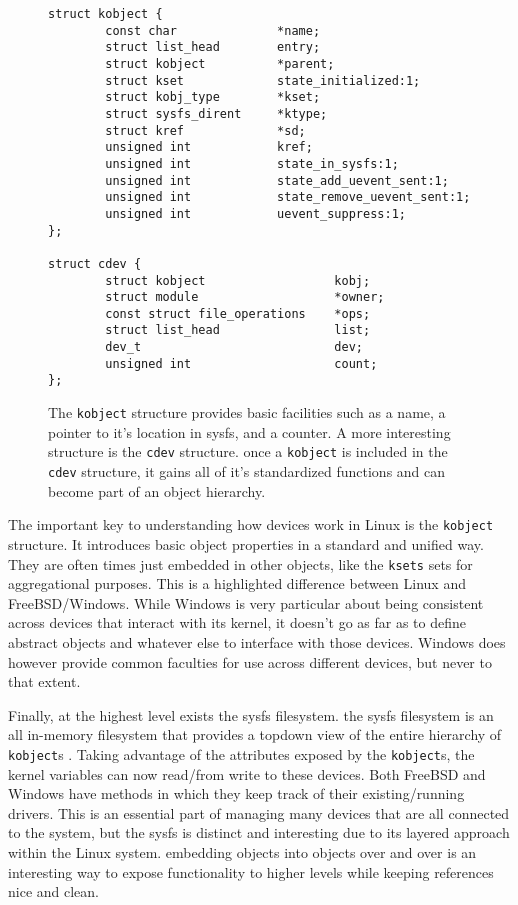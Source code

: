 \documentclass[10pt,draftclsnofoot,onecolumn]{IEEEtran}
\begin{document}
\begin{figure}[h]
\begin{lstlisting}
struct kobject {
        const char              *name;
        struct list_head        entry;
        struct kobject          *parent;
        struct kset             state_initialized:1;
        struct kobj_type        *kset;
        struct sysfs_dirent     *ktype;
        struct kref             *sd;
        unsigned int            kref;
        unsigned int            state_in_sysfs:1;
        unsigned int            state_add_uevent_sent:1;
        unsigned int            state_remove_uevent_sent:1;
        unsigned int            uevent_suppress:1;
};

struct cdev {
        struct kobject                  kobj;
        struct module                   *owner;
        const struct file_operations    *ops;
        struct list_head                list;
        dev_t                           dev;
        unsigned int                    count;
};
\end{lstlisting}
\centering
\captionsetup{justification=centering}
\caption{
  The \texttt{kobject} structure provides basic facilities such as a name, a pointer to it's location in sysfs, and a counter.
  A more interesting structure is the \texttt{cdev} structure.
  once a \texttt{kobject} is included in the \texttt{cdev} structure, it gains all of it's standardized functions and can become part of an object hierarchy.
}
\label{code:kobject_struct}
\end{figure}

\par The important key to understanding how devices work in Linux is the \texttt{kobject} structure.
It introduces basic object properties in a standard and unified way.
They are often times just embedded in other objects, like the \texttt{ksets} sets for aggregational purposes.
This is a highlighted difference between Linux and FreeBSD/Windows.
While Windows is very particular about being consistent across devices that interact with its kernel, it doesn't go as far as to define abstract objects and whatever else to interface with those devices.
Windows does however provide common faculties for use across different devices, but never to that extent.

\par Finally, at the highest level exists the sysfs filesystem.
the sysfs filesystem is an all in-memory filesystem that provides a topdown view of the entire hierarchy of \texttt{kobject}s \cite{linux:1}.
Taking advantage of the attributes exposed by the \texttt{kobject}s, the kernel variables can now read/from write to these devices.
Both FreeBSD and Windows have methods in which they keep track of their existing/running drivers.
This is an essential part of managing many devices that are all connected to the system, but the sysfs is distinct and interesting due to its layered approach within the Linux system.
embedding objects into objects over and over is an interesting way to expose functionality to higher levels while keeping references nice and clean.
\end{document}
